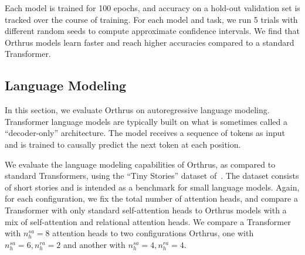 Each model is trained for 100 epochs, and accuracy on a hold-out validation set is tracked over the course of training. For each model and task, we run 5 trials with different random seeds to compute approximate confidence intervals. We find that Orthrus models learn faster and reach higher accuracies compared to a standard Transformer.


\subsection{Language Modeling}\label{ssec:tiny_stories}

In this section, we evaluate Orthrus on autoregressive language modeling. Transformer language models are typically built on what is sometimes called a ``decoder-only'' architecture. The model receives a sequence of tokens as input and is trained to causally predict the next token at each position.

We evaluate the language modeling capabilities of Orthrus, as compared to standard Transformers, using the ``Tiny Stories'' dataset of~\citet{eldanTinyStoriesHowSmall2023}. The dataset consists of short stories and is intended as a benchmark for small language models. Again, for each configuration, we fix the total number of attention heads, and compare a Transformer with only standard self-attention heads to Orthrus models with a mix of self-attention and relational attention heads. We compare a Transformer with $n_h^{sa} = 8$ attention heads to two configurations Orthrus, one with $n_h^{sa} = 6, n_h^{ra} = 2$ and another with $n_h^{sa} = 4, n_h^{ra} = 4$.


